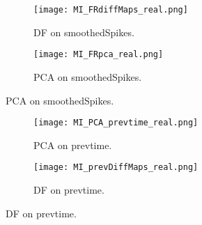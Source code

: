 \vspace{2in}
\begin{frame}[allowframebreaks]
\begin{figure}
\centering
\begin{subfigure}{.5\textwidth}
\texttt{[image: MI\_FRdiffMaps\_real.png]}
\caption{DF on smoothedSpikes.}
\end{subfigure}%
\begin{subfigure}{0.5\textwidth}
\texttt{[image: MI\_FRpca\_real.png]}
\caption{PCA on smoothedSpikes.}
\end{subfigure}
\end{figure}
\end{frame}


\vspace{1in}
\begin{frame}[allowframebreaks]
\begin{figure}
\centering
\begin{subfigure}{.5\textwidth}
\texttt{[image: MI\_PCA\_prevtime\_real.png]}
\caption{PCA on prevtime.}
\end{subfigure}%
\begin{subfigure}{0.5\textwidth}
\texttt{[image: MI\_prevDiffMaps\_real.png]}
\caption{DF on prevtime.}
\end{subfigure}
\end{figure}
\end{frame}









\newpage































